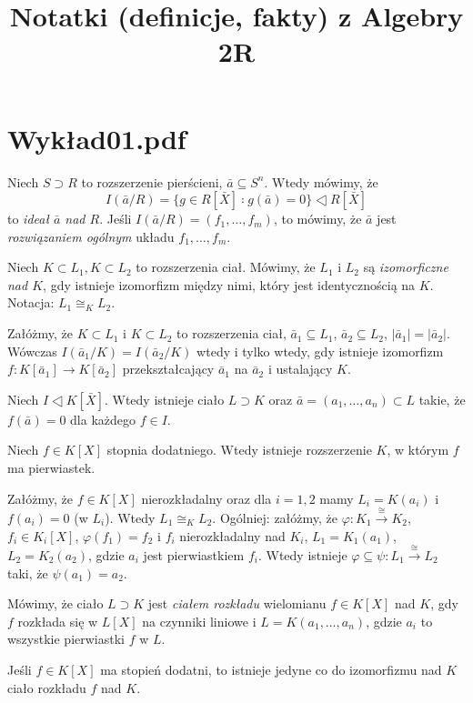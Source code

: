 \documentclass[a4paper, 12pt]{article}
\title{Notatki (definicje, fakty) z Algebry 2R}
\author{}
\date{\vspace{-4ex}}
\newcommand{\+}{\enspace}
\begin{document}
\maketitle

\section*{Wykład01.pdf}

Niech $S ⊃ R$ to rozszerzenie pierścieni, $\bar{a} ⊆ S^n$.
Wtedy mówimy, że
$$I(\bar{a}/R) = \{ g∈R[\bar{X}] ∶ g(\bar{a}) = 0 \} ◁ R[\bar{X}]$$
to \textit{ideał $\bar{a}$ nad $R$}.
Jeśli $I(\bar{a}/R) = (f_1, …, f_m)$, to mówimy,
że $\bar{a}$ jest \textit{rozwiązaniem ogólnym} układu $f_1, …, f_m$.

Niech $K ⊂ L_1, K ⊂ L_2$ to rozszerzenia ciał.
Mówimy, że $L_1$ i $L_2$ są \textit{izomorficzne nad $K$},
gdy istnieje izomorfizm między nimi,
który jest identycznością na $K$.
Notacja: $L_1 ≅_K L_2$.

Załóżmy, że $K ⊂ L_1$ i $K ⊂ L_2$ to rozszerzenia ciał,
$\bar{a}_1 ⊆ L_1$, $\bar{a}_2 ⊆ L_2$, $|\bar{a}_1| = |\bar{a}_2|$.
Wówczas $I(\bar{a}_1/K) = I(\bar{a}_2/K)$ wtedy i tylko wtedy,
gdy istnieje izomorfizm $f: K[\bar{a}_1] → K[\bar{a}_2]$
przekształcający $\bar{a}_1$ na $\bar{a}_2$ i ustalający $K$.

Niech $I ◁ K[\bar{X}]$.
Wtedy istnieje ciało $L ⊃ K$ oraz $\bar{a} = (a_1,…,a_n)⊂L$ takie,
że $f(\bar{a}) = 0$ dla każdego $f∈I$.

Niech $f∈K[X]$ stopnia dodatniego.
Wtedy istnieje rozszerzenie $K$, w którym $f$ ma pierwiastek.

Załóżmy, że $f∈K[X]$ nierozkładalny oraz dla $i=1,2$ mamy
$L_i = K(a_i)$ i $f(a_i) = 0$ (w $L_i$).
Wtedy $L_1 ≅_K L_2$.
Ogólniej: załóżmy, że $φ: K_1 \stackrel{≅}{→} K_2$, $f_i∈K_i[X]$,
$φ(f_1) = f_2$ i $f_i$ nierozkładalny nad $K_i$,
$L_1 = K_1(a_1)$, $L_2 = K_2(a_2)$,
gdzie $a_i$ jest pierwiastkiem $f_i$.
Wtedy istnieje $φ ⊆ ψ: L_1 \stackrel{≅}{→} L_2$ taki, że
$ψ(a_1) = a_2$.

Mówimy, że ciało $L ⊃ K$ jest \textit{ciałem rozkładu} wielomianu $f∈K[X]$ nad
$K$,
gdy $f$ rozkłada się w $L[X]$ na czynniki liniowe
i $L=K(a_1,…,a_n)$, gdzie $a_i$ to wszystkie pierwiastki $f$ w $L$.

Jeśli $f∈K[X]$ ma stopień dodatni,
to istnieje jedyne co do izomorfizmu nad $K$
ciało rozkładu $f$ nad $K$.

\end{document}
